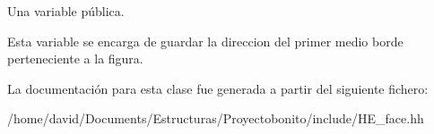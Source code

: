 Una variable pública. 

Esta variable se encarga de guardar la direccion del primer medio borde perteneciente a la figura. 

La documentación para esta clase fue generada a partir del siguiente fichero\-:\begin{DoxyCompactItemize}
\item 
/home/david/\-Documents/\-Estructuras/\-Proyectobonito/include/H\-E\-\_\-face.\-hh\end{DoxyCompactItemize}
